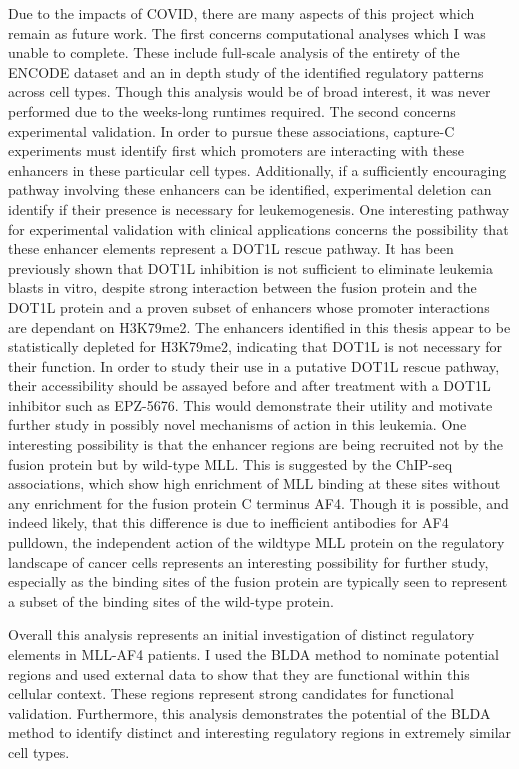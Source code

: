 Due to the impacts of COVID, there are many aspects of this project which remain as future work. The first concerns computational analyses which I was unable to complete. These include full-scale analysis of the entirety of the ENCODE dataset and an in depth study of the identified regulatory patterns across cell types. Though this analysis would be of broad interest, it was never performed due to the weeks-long runtimes required. The second concerns experimental validation. In order to pursue these associations, capture-C experiments must identify first which promoters are interacting with these enhancers in these particular cell types. Additionally, if a sufficiently encouraging pathway involving these enhancers can be identified, experimental deletion can identify if their presence is necessary for leukemogenesis. One interesting pathway for experimental validation with clinical applications concerns the possibility that these enhancer elements represent a DOT1L rescue pathway. It has been previously shown that DOT1L inhibition is not sufficient to eliminate leukemia blasts in vitro, despite strong interaction between the fusion protein and the DOT1L protein and a proven subset of enhancers whose promoter interactions are dependant on H3K79me2. The enhancers identified in this thesis appear to be statistically depleted for H3K79me2, indicating that DOT1L is not necessary for their function. In order to study their use in a putative DOT1L rescue pathway, their accessibility should be assayed before and after treatment with a DOT1L inhibitor such as EPZ-5676. This would demonstrate their utility and motivate further study in possibly novel mechanisms of action in this leukemia. One interesting possibility is that the enhancer regions are being recruited not by the fusion protein but by wild-type MLL. This is suggested by the ChIP-seq associations, which show high enrichment of MLL binding at these sites without any enrichment for the fusion protein C terminus AF4. Though it is possible, and indeed likely, that this difference is due to inefficient antibodies for AF4 pulldown, the independent action of the wildtype MLL protein on the regulatory landscape of cancer cells represents an interesting possibility for further study, especially as the binding sites of the fusion protein are typically seen to represent a subset of the binding sites of the wild-type protein.

Overall this analysis represents an initial investigation of distinct regulatory elements in MLL-AF4 patients. I used the BLDA method to nominate potential regions and used external data to show that they are functional within this cellular context. These regions represent strong candidates for functional validation. Furthermore, this analysis demonstrates the potential of the BLDA method to identify distinct and interesting regulatory regions in extremely similar cell types.

